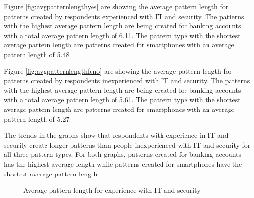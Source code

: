     Figure \ref{fig:avgpatternlengthyes} are showing the average pattern length for patterns created by respondents experienced with IT and security. The patterns with the highest average pattern length are being created for banking accounts with a total average pattern length of 6.11. The pattern type with the shortest average pattern length are patterns created for smartphones with an average pattern length of 5.48.

    Figure \ref{fig:avgpatternlengthfeno} are showing the average pattern length for patterns created by respondents inexperienced with IT and security. The patterns with the highest average pattern length are being created for banking accounts with a total average pattern length of 5.61. The pattern type with the shortest average pattern length are patterns created for smartphones with an average pattern length of 5.27. 

    The trends in the graphs show that respondents with experience in IT and security create longer patterns than people inexperienced with IT and security for all three pattern types. For both graphs, patterns created for banking accounts has the highest average length while patterns created for smartphones have the shortest average pattern length. 

      \begin{figure}[H]
        \centering
        \caption{Average pattern length for experience with IT and security}
        \label{fig:avgpatternlengthexperience}
      \end{figure}

